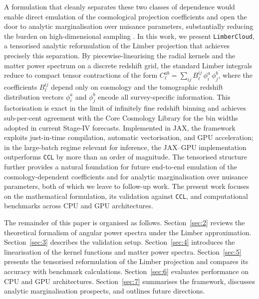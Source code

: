 A formulation that cleanly separates these two classes of dependence would enable direct emulation of the cosmological projection coefficients and open the door to analytic marginalisation over nuisance parameters, substantially reducing the burden on high-dimensional sampling \citep{2020JCAP...10..056H, 2023MNRAS.522.5037R, 2023OJAp....6E..23H, 2025A&A...693A.178R, 2026arXiv260424425R}. In this work, we present \texttt{LimberCloud}, a tensorised analytic reformulation of the Limber projection that achieves precisely this separation. By piecewise-linearising the radial kernels and the matter power spectrum on a discrete redshift grid, the standard Limber integrals reduce to compact tensor contractions of the form \(C^{ab}_\ell = \sum_{ij} B^{ij}_\ell \, \phi^{a}_{i} \, \phi^{b}_{j}\), where the coefficients \(B^{ij}_\ell\) depend only on cosmology and the tomographic redshift distribution vectors \(\phi^{a}_{i}\) and \(\phi^{b}_{j}\) encode all survey-specific information. This factorisation is exact in the limit of infinitely fine redshift binning and achieves sub-per-cent agreement with the Core Cosmology Library \citep[\texttt{CCL};][]{2019ApJS..242....2C} for the bin widths adopted in current Stage-IV forecasts. Implemented in JAX, the framework exploits just-in-time compilation, automatic vectorisation, and GPU acceleration; in the large-batch regime relevant for inference, the JAX--GPU implementation outperforms \texttt{CCL} by more than an order of magnitude. The tensorised structure further provides a natural foundation for future end-to-end emulation of the cosmology-dependent coefficients and for analytic marginalisation over nuisance parameters, both of which we leave to follow-up work. The present work focuses on the mathematical formulation, its validation against \texttt{CCL}, and computational benchmarks across CPU and GPU architectures.

The remainder of this paper is organised as follows. Section~\ref{sec:2} reviews the theoretical formalism of angular power spectra under the Limber approximation. Section~\ref{sec:3} describes the validation setup. Section~\ref{sec:4} introduces the linearisation of the kernel functions and matter power spectra. Section~\ref{sec:5} presents the tensorised reformulation of the Limber projection and compares its accuracy with benchmark calculations. Section~\ref{sec:6} evaluates performance on CPU and GPU architectures. Section~\ref{sec:7} summarises the framework, discusses analytic marginalisation prospects, and outlines future directions.
